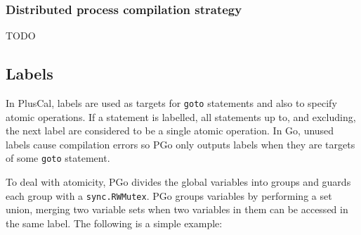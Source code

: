 \subsubsection{Distributed process compilation strategy}

TODO

\subsection{Labels}
\label{sec:labels}
In PlusCal, labels are used as targets for \texttt{goto} statements and also to specify atomic operations. If a statement is labelled, all statements up to, and excluding, the next label are considered to be a single atomic operation. In Go, unused labels cause compilation errors so PGo only outputs labels when they are targets of some \texttt{goto} statement.

To deal with atomicity, PGo divides the global variables into groups and guards each group with a \texttt{sync.RWMutex}. PGo groups variables by performing a set union, merging two variable sets when two variables in them can be accessed in the same label. The following is a simple example:


